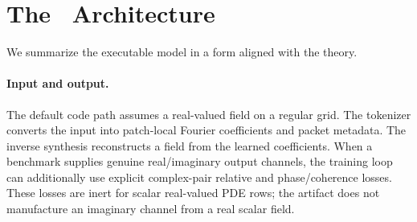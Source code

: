 \section{The \MiNO\ Architecture}
\label{sec:architecture}

We summarize the executable model in a form aligned with the theory.

\paragraph{Input and output.}
The default code path assumes a real-valued field on a regular grid. The tokenizer converts the input into patch-local Fourier coefficients and packet metadata. The inverse synthesis reconstructs a field from the learned coefficients.  When a benchmark supplies genuine real/imaginary output channels, the training loop can additionally use explicit complex-pair relative and phase/coherence losses.  These losses are inert for scalar real-valued PDE rows; the artifact does not manufacture an imaginary channel from a real scalar field.

